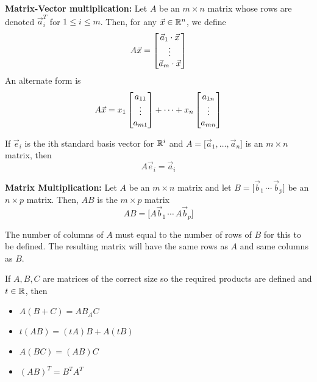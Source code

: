 \documentclass[english, 12pt]{article}
\begin{document}
\begin{defn}
\textbf{Matrix-Vector multiplication:} Let $A$ be an $m \times n$ matrix whose rows are denoted $\vec{a}_{i}^T$ for $1 \leq i \leq m$. Then, for any $\vec{x} \in {\mathbb{R}}^n$, we define
\[ A \vec{x} = \begin{bmatrix} \vec{a}_{1} \cdot \vec{x} \\ \vdots \\ \vec{a}_{m} \cdot \vec{x} \end{bmatrix} \]
An alternate form is
\[ A \vec{x} = x_{1} \begin{bmatrix} a_{11} \\ \vdots \\ a_{m1} \end{bmatrix} + \cdots + x_{n} \begin{bmatrix} a_{1n} \\ \vdots \\ a_{mn} \end{bmatrix} \]
\end{defn}

\begin{thrm}
If $\vec{e}_{i}$ is the ith standard basis vector for ${\mathbb{R}}^i$ and $A = \lbrack \vec{a}_{1},\dots,\vec{a}_{n} \rbrack$ is an $m \times n$ matrix, then
\[A \vec{e}_i = \vec{a}_{i}\]
\end{thrm}

\begin{mthd}
\textbf{Matrix Multiplication:} Let $A$ be an $m \times n$ matrix and let $B = \lbrack \vec{b}_{1}\, \cdots\, \vec{b}_{p} \rbrack$ be an $n \times p$ matrix. Then, $AB$ is the $m \times p$ matrix
\[ AB = \lbrack A \vec{b}_{1} \, \cdots \, A \vec{b}_{p}\rbrack \]
\end{mthd}

\begin{note}
The number of columns of $A$ must equal to the number of rows of $B$ for this to be defined. The resulting matrix will have the same rows as $A$ and same columns as $B$.
\end{note}

\begin{thrm}
If $A,B,C$ are matrices of the correct size so the required products are defined and $t \in {\mathbb{R}}$, then
\begin{itemize}
\item $A(B+C) = AB _ AC$
\item $t (AB) = (tA)B + A(tB)$
\item $A(BC) = (AB)C$
\item $(AB)^T = B^T A^T$
\end{itemize}
\end{thrm}
\end{document}
